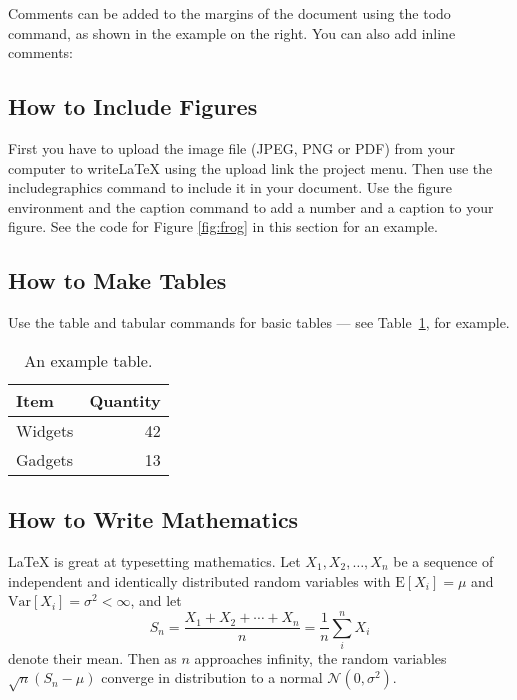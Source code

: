 \documentclass[a4paper]{article}
\begin{document}
Comments can be added to the margins of the document using the  todo command, as shown in the example on the right. You can also add inline comments:


\subsection{How to Include Figures}

First you have to upload the image file (JPEG, PNG or PDF) from your computer to writeLaTeX using the upload link the project menu. Then use the includegraphics command to include it in your document. Use the figure environment and the caption command to add a number and a caption to your figure. See the code for Figure \ref{fig:frog} in this section for an example.


\subsection{How to Make Tables}

Use the table and tabular commands for basic tables --- see Table~\ref{tab:widgets}, for example.

\begin{table}
\centering
\begin{tabular}{l|r}
Item & Quantity \\\hline
Widgets & 42 \\
Gadgets & 13
\end{tabular}
\caption{\label{tab:widgets}An example table.}
\end{table}

\subsection{How to Write Mathematics}

\LaTeX{} is great at typesetting mathematics. Let $X_1, X_2, \ldots, X_n$ be a sequence of independent and identically distributed random variables with $\text{E}[X_i] = \mu$ and $\text{Var}[X_i] = \sigma^2 < \infty$, and let
$$S_n = \frac{X_1 + X_2 + \cdots + X_n}{n}
      = \frac{1}{n}\sum_{i}^{n} X_i$$
denote their mean. Then as $n$ approaches infinity, the random variables $\sqrt{n}(S_n - \mu)$ converge in distribution to a normal $\mathcal{N}(0, \sigma^2)$.
\end{document}
